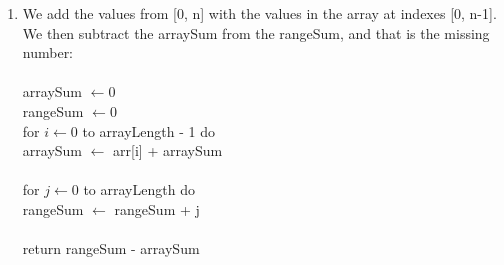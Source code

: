 \documentclass[a4paper,10pt]{article}
\begin{document}
\begin{enumerate}
\\\\\\\\\\
\item We add the values from [0, n] with the values in the array at indexes [0, n-1]. We then subtract the arraySum from the rangeSum, and that is the missing number:\\\\
arraySum $\leftarrow 0$\\
rangeSum $\leftarrow 0$\\
for $i \leftarrow 0$ to arrayLength - 1 do\\
\setlength\parindent{24pt}
\indent arraySum $\leftarrow$ arr[i] + arraySum\\\\
for $j \leftarrow 0$ to arrayLength do\\
\setlength\parindent{24pt}
\indent rangeSum $\leftarrow$ rangeSum + j\\\\
return rangeSum - arraySum
\end{enumerate}
\end{document}
